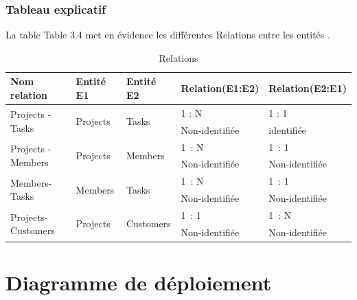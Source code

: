 \newpage
\subsubsection{Tableau explicatif}

La table Table 3.4 met en évidence les différentes Relations entre les entités .
\begin{table}
\begin{tabular}{|l|l|l|l|l|}
\hline
Nom relation                        & Entité E1                 & Entité E2                  & Relation(E1:E2) & Relation(E2:E1)  \\
\hline
\multirow{2}{*}{Projects -Tasks}    & \multirow{2}{*}{Projects} & \multirow{2}{*}{Tasks}     & 1 : N           & 1 : 1            \\
\cline{4-5}
                                    &                           &                            & Non-identifiée  & identifiée       \\
\hline
\multirow{2}{*}{Projects -Members}  & \multirow{2}{*}{Projects} & \multirow{2}{*}{Members}   & 1~: N           & 1~: 1            \\
\cline{4-5}
                                    &                           &                            & Non-identifiée  & Non-identifiée   \\
\hline
\multirow{2}{*}{Members-Tasks}      & \multirow{2}{*}{Members}  & \multirow{2}{*}{Tasks}     & 1~: N           & 1~: 1            \\
\cline{4-5}
                                    &                           &                            & Non-identifiée  & Non-identifiée   \\
\hline
\multirow{2}{*}{Projects-Customers} & \multirow{2}{*}{Projects} & \multirow{2}{*}{Customers} & 1~: 1           & 1~: N            \\
\cline{4-5}
                                    &                           &                            & Non-identifiée  & Non-identifiée   \\
\hline
\end{tabular}
\centering
\caption {Relations}
\end{table}


\newpage



\section{Diagramme de d\'{e}ploiement }


